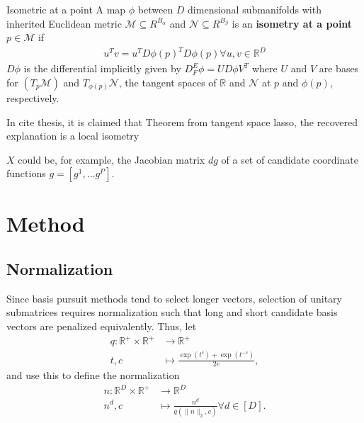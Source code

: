 \documentclass[a4paper,11pt]{article}
\begin{document}
\begin{definition}{Isometric at a point}
A map $\phi$ between $D$ dimensional submanifolds with inherited Euclidean metric $\mathcal M \subseteq R^{B_\alpha}$ and $\mathcal N  \subseteq R^{B_\beta}$ is an \textbf{isometry at a point} $p \in \mathcal M$ if
\begin{align}
u^T v = u^T {D \phi (p)}^T D \phi (p) \forall u,v \in \mathbb R^D
\end{align}
$D \phi$ is the differential implicitly given by $D_{F}^E \phi = U D \phi V^T$ where $U$ and $V$ are bases for $(T_p \mathcal M)$ and $T_{\phi(p)} \mathcal N$, the tangent spaces of $\mathbb R$ and $\mathcal N$ at $p$ and $\phi(p)$, respectively.
\end{definition}

In cite thesis, it is claimed that Theorem from tangent space lasso, the recovered explanation is a local isometry

$X$ could be, for example, the Jacobian matrix $d g$ of a set of candidate coordinate functions $g = [g^1, \dotsc g^P]$.


\section{Method}


\subsection{Normalization}

Since basis pursuit methods tend to select longer vectors, selection of unitary submatrices requires normalization such that long and short candidate basis vectors are penalized equivalently.
Thus, let
\begin{align}
\label{eq:normalization}
q: \mathbb R^+ \times \mathbb R^+  &\to \mathbb R^+ \\
t , c &\mapsto \frac{\exp(t^c) + \exp(t^{-c})}{2e},
\end{align}
and use this to define the normalization 
\begin{align}
n: \mathbb R^D \times \mathbb R^+ &\to \mathbb R^D \\
n^d , c &\mapsto \frac{n^d}{q(\|n\|_{2},c) } \forall d \in [D].
\end{align}
\end{document}
